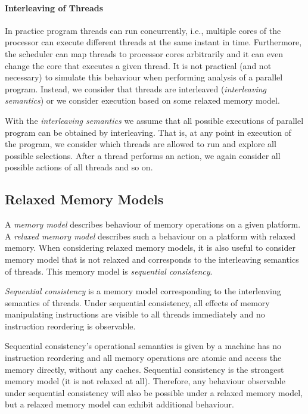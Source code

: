\paragraph{Interleaving of Threads}

In practice program threads can run concurrently, i.e., multiple cores of the
processor can execute different threads at the same instant in time.
Furthermore, the scheduler can map threads to processor cores arbitrarily and
it can even change the core that executes a given thread.
It is not practical (and not necessary) to simulate this behaviour when
performing analysis of a parallel program.
Instead, we consider that threads are interleaved (\emph{interleaving
semantics}) or we consider execution based on some relaxed memory model.

\begin{definition}
    With the \emph{interleaving semantics} we assume that all possible
    executions of parallel program can be obtained by interleaving.
    That is, at any point in execution of the program, we consider which threads
    are allowed to run and explore all possible selections.
    After a thread performs an action, we again consider all possible actions
    of all threads and so on.
\end{definition}



\subsection{Relaxed Memory Models}

A \emph{memory model} describes behaviour of memory operations on a given platform.
A \emph{relaxed memory model} describes such a behaviour on a platform with relaxed memory.
When considering relaxed memory models, it is also useful to consider memory
model that is not relaxed and corresponds to the interleaving semantics of
threads.
This memory model is \emph{sequential consistency}.

\begin{definition}
    \emph{Sequential consistency} is a memory model corresponding to the
    interleaving semantics of threads.
    Under sequential consistency, all effects of memory manipulating
    instructions are visible to all threads immediately and no instruction
    reordering is observable.
\end{definition}

Sequential consistency's operational semantics is given by a machine has no instruction reordering and all memory operations are atomic and access the memory directly, without any caches.
Sequential consistency is the strongest memory model (it is not relaxed at all).
Therefore, any behaviour observable under sequential consistency will also be possible under a relaxed memory model, but a relaxed memory model can exhibit additional behaviour.

